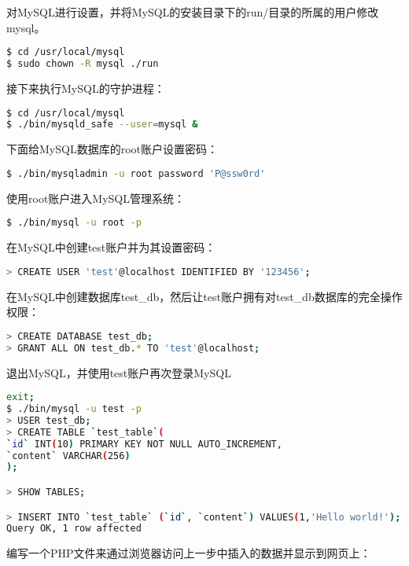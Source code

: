 对MySQL进行设置，并将MySQL的安装目录下的run/目录的所属的用户修改mysql。


\begin{lstlisting}[language=bash]
$ cd /usr/local/mysql
$ sudo chown -R mysql ./run
\end{lstlisting}

接下来执行MySQL的守护进程：


\begin{lstlisting}[language=bash]
$ cd /usr/local/mysql
$ ./bin/mysqld_safe --user=mysql &
\end{lstlisting}

下面给MySQL数据库的root账户设置密码：

\begin{lstlisting}[language=bash]
$ ./bin/mysqladmin -u root password 'P@ssw0rd'
\end{lstlisting}

使用root账户进入MySQL管理系统：

\begin{lstlisting}[language=bash]
$ ./bin/mysql -u root -p
\end{lstlisting}

在MySQL中创建test账户并为其设置密码：

\begin{lstlisting}[language=bash]
> CREATE USER 'test'@localhost IDENTIFIED BY '123456';
\end{lstlisting}

在MySQL中创建数据库test\_db，然后让test账户拥有对test\_db数据库的完全操作权限：


\begin{lstlisting}[language=bash]
> CREATE DATABASE test_db;
> GRANT ALL ON test_db.* TO 'test'@localhost;
\end{lstlisting}



退出MySQL，并使用test账户再次登录MySQL

\begin{lstlisting}[language=bash]
exit;
$ ./bin/mysql -u test -p
> USER test_db;
> CREATE TABLE `test_table`(
`id` INT(10) PRIMARY KEY NOT NULL AUTO_INCREMENT,
`content` VARCHAR(256)
);

> SHOW TABLES;

> INSERT INTO `test_table` (`id`, `content`) VALUES(1,'Hello world!');
Query OK, 1 row affected
\end{lstlisting}

编写一个PHP文件来通过浏览器访问上一步中插入的数据并显示到网页上：


